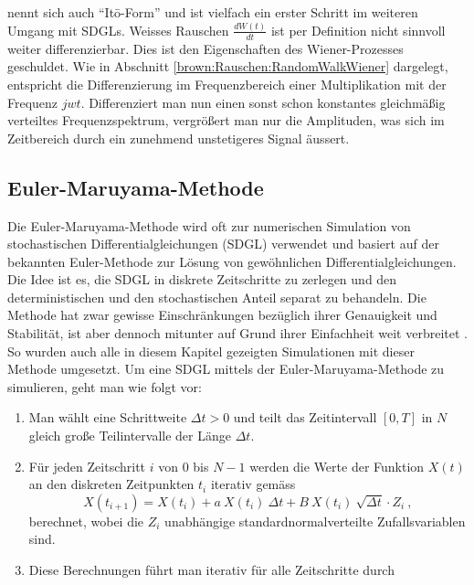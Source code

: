 nennt sich auch ``Itō-Form'' und ist vielfach ein erster Schritt im weiteren Umgang mit SDGLs.
Weisses Rauschen $ \frac{dW(t)}{dt} $ ist per Definition nicht sinnvoll weiter differenzierbar. Dies ist den Eigenschaften des Wiener-Prozesses geschuldet. Wie in Abschnitt \ref{brown:Rauschen:RandomWalkWiener} dargelegt, entspricht die Differenzierung im Frequenzbereich einer Multiplikation mit der Frequenz $ jwt $. Differenziert man nun einen sonst schon konstantes gleichmäßig verteiltes Frequenzspektrum, vergrößert man nur die Amplituden, was sich im Zeitbereich durch ein zunehmend unstetigeres Signal äussert.



\subsection{Euler-Maruyama-Methode\label{brown:Simulation}}

Die Euler-Maruyama-Methode wird oft zur numerischen Simulation von stochastischen Differentialgleichungen (SDGL) verwendet und basiert auf der bekannten Euler-Methode zur Lösung von gewöhnlichen Differentialgleichungen. Die Idee ist es, die SDGL in diskrete Zeitschritte zu zerlegen und den deterministischen und den stochastischen Anteil separat zu behandeln. Die Methode hat zwar gewisse Einschränkungen bezüglich ihrer Genauigkeit und Stabilität, ist aber dennoch mitunter auf Grund ihrer Einfachheit weit verbreitet \cite{Bayram2018}. So wurden auch alle in diesem Kapitel gezeigten Simulationen mit dieser Methode umgesetzt. Um eine SDGL mittels der Euler-Maruyama-Methode zu simulieren, geht man wie folgt vor:




\begin{enumerate}
	\item Man wählt eine Schrittweite $ \Delta t > 0 $ und teilt das Zeitintervall $ [0, T] $ in $ N $ gleich große Teilintervalle der Länge $ \Delta t $.
	\item Für jeden Zeitschritt $ i $ von $ 0 $ bis $ N-1 $ werden die Werte der Funktion $ X(t) $ an den diskreten Zeitpunkten $ t_i $ iterativ gemäss
	\begin{equation}
		X(t_{i+1}) = X(t_i) + a \ X(t_i) \ \Delta t + B \ X(t_i) \ \sqrt{\Delta t} \cdot Z_i \ ,
	\end{equation}
	berechnet, wobei die $ Z_i $ unabhängige standardnormalverteilte Zufallsvariablen sind.
	\item Diese Berechnungen führt man iterativ für alle Zeitschritte durch
\end{enumerate}

